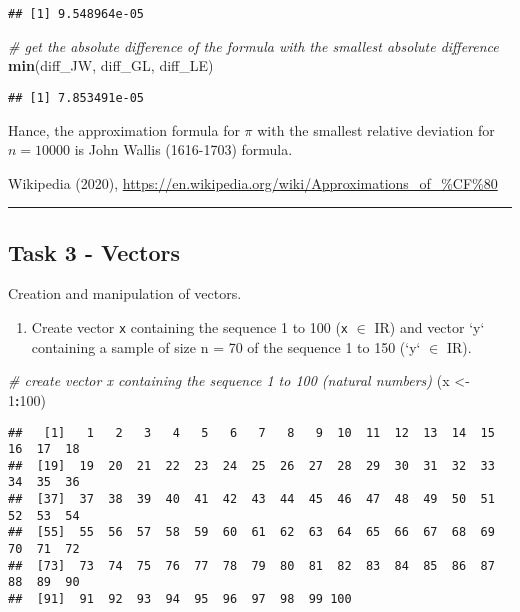 \documentclass[
]{article}
\newenvironment{Shaded}{\begin{snugshade}}{\end{snugshade}}
\newcommand{\CommentTok}[1]{\textcolor[rgb]{0.56,0.35,0.01}{\textit{#1}}}
\newcommand{\DecValTok}[1]{\textcolor[rgb]{0.00,0.00,0.81}{#1}}
\newcommand{\KeywordTok}[1]{\textcolor[rgb]{0.13,0.29,0.53}{\textbf{#1}}}
\newcommand{\NormalTok}[1]{#1}
\newcommand{\OperatorTok}[1]{\textcolor[rgb]{0.81,0.36,0.00}{\textbf{#1}}}
\newcommand{\StringTok}[1]{\textcolor[rgb]{0.31,0.60,0.02}{#1}}
\providecommand{\tightlist}{%
  \setlength{\itemsep}{0pt}\setlength{\parskip}{0pt}}
\begin{document}
\begin{verbatim}
## [1] 9.548964e-05
\end{verbatim}

\begin{Shaded}
\begin{Highlighting}[]
\CommentTok{# get the absolute difference of the formula with the smallest absolute difference}
\KeywordTok{min}\NormalTok{(diff_JW, diff_GL, diff_LE)}
\end{Highlighting}
\end{Shaded}

\begin{verbatim}
## [1] 7.853491e-05
\end{verbatim}

Hance, the approximation formula for \(\pi\) with the smallest relative
deviation for \(n = 10000\) is John Wallis (1616-1703) formula.

Wikipedia (2020),
\url{https://en.wikipedia.org/wiki/Approximations_of_\%CF\%80}

\begin{center}\rule{0.5\linewidth}{0.5pt}\end{center}

\hypertarget{task-3---vectors}{%
\subsection{Task 3 - Vectors}\label{task-3---vectors}}

Creation and manipulation of vectors.

\begin{enumerate}
\def\labelenumi{\arabic{enumi}.}
\tightlist
\item
  Create vector \texttt{x} containing the sequence 1 to 100 (\texttt{x}
  \(\in\)
  \rm I\!R) and vector `y` containing a sample of size n = 70 of the sequence 1 to 150 (`y` $\in$ \rm I\!R).
\end{enumerate}

\begin{Shaded}
\begin{Highlighting}[]
\CommentTok{# create vector x containing the sequence 1 to 100 (natural numbers)}
\NormalTok{(x <-}\StringTok{ }\DecValTok{1}\OperatorTok{:}\DecValTok{100}\NormalTok{)}
\end{Highlighting}
\end{Shaded}

\begin{verbatim}
##   [1]   1   2   3   4   5   6   7   8   9  10  11  12  13  14  15  16  17  18
##  [19]  19  20  21  22  23  24  25  26  27  28  29  30  31  32  33  34  35  36
##  [37]  37  38  39  40  41  42  43  44  45  46  47  48  49  50  51  52  53  54
##  [55]  55  56  57  58  59  60  61  62  63  64  65  66  67  68  69  70  71  72
##  [73]  73  74  75  76  77  78  79  80  81  82  83  84  85  86  87  88  89  90
##  [91]  91  92  93  94  95  96  97  98  99 100
\end{verbatim}
\end{document}
